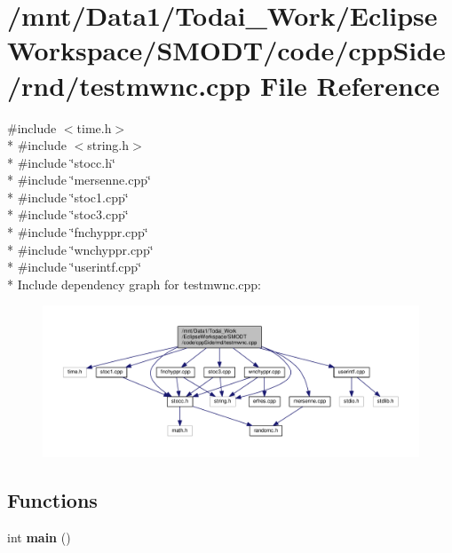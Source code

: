 \section{/mnt/\-Data1/\-Todai\-\_\-\-Work/\-Eclipse\-Workspace/\-S\-M\-O\-D\-T/code/cpp\-Side/rnd/testmwnc.cpp File Reference}
\label{rnd_2testmwnc_8cpp}
{\ttfamily \#include $<$time.\-h$>$}\\*
{\ttfamily \#include $<$string.\-h$>$}\\*
{\ttfamily \#include \char`\"{}stocc.\-h\char`\"{}}\\*
{\ttfamily \#include \char`\"{}mersenne.\-cpp\char`\"{}}\\*
{\ttfamily \#include \char`\"{}stoc1.\-cpp\char`\"{}}\\*
{\ttfamily \#include \char`\"{}stoc3.\-cpp\char`\"{}}\\*
{\ttfamily \#include \char`\"{}fnchyppr.\-cpp\char`\"{}}\\*
{\ttfamily \#include \char`\"{}wnchyppr.\-cpp\char`\"{}}\\*
{\ttfamily \#include \char`\"{}userintf.\-cpp\char`\"{}}\\*
Include dependency graph for testmwnc.\-cpp\-:
\nopagebreak
\begin{figure}[H]
\begin{center}
\leavevmode
\includegraphics[width=350pt]{rnd_2testmwnc_8cpp__incl}
\end{center}
\end{figure}
\subsection*{Functions}
\begin{DoxyCompactItemize}
\item 
int {\bf main} ()
\end{DoxyCompactItemize}
